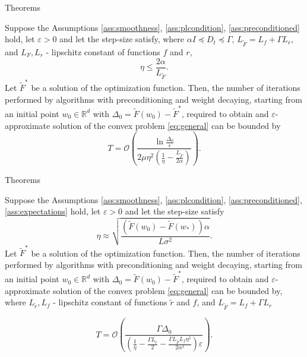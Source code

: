 \documentclass[aspectratio=169, 12pt]{beamer}
\begin{document}
\begin{frame}{Theorems}
    \begin{theorem}
\label{theor:2}
    Suppose the Assumptions \ref{ass:smoothness}, \ref{ass:plcondition}, \ref{ass:preconditioned} hold, let $\varepsilon > 0$ and let the step-size satisfy, where $\alpha I \preccurlyeq D_t \preccurlyeq \Gamma$, $L_{\tilde{F}} = L_{f} + \Gamma L_{r}$, and $L_{F}, L_{r}$ - lipschitz constant of functions $f$ and $r$, 
    \begin{equation*}
        \eta \leq \frac{2 \alpha}{L_{\widetilde{F}}}.
    \end{equation*}
    Let $\tilde{F}^*$ be a solution of the optimization function. Then, the number of iterations performed by algorithms with preconditioning and weight decaying, starting from an initial point $w_0 \in \mathbb{R}^d$ with $\Delta_0 = \tilde{F}(w_0) - \tilde{F}^*$, required to obtain and $\varepsilon$-approximate solution of the convex problem \eqref{eq:general} can be bounded by
    \begin{equation*}
        T =  \mathcal{O}\left( \frac{\ln \frac{\Delta_0}{\epsilon}}{2 \mu \eta^2 \left(\frac{1}{\eta} - \frac{L_{\tilde{F}}}{2 \alpha} \right)} \right).
    \end{equation*}
\end{theorem}
\end{frame}

\begin{frame}[shrink]{Theorems}
    \begin{theorem}[3]
    Suppose the Assumptions \ref{ass:smoothness}, \ref{ass:plcondition}, \ref{ass:preconditioned}, \ref{ass:expectations} hold, let $\varepsilon > 0$ and let the step-size satisfy
    \begin{equation*}
        \eta \approx \sqrt{\frac{\left( \tilde{F}(w_0) - \tilde{F}(w_*) \right)\alpha}{L \sigma^2}}.
    \end{equation*}
    Let $\tilde{F}^*$ be a solution of the optimization function. Then, the number of iterations performed by algorithms with preconditioning and weight decaying, starting from an initial point $w_0 \in \mathbb{R}^d$ with $\Delta_0 = \tilde{F}(w_0) - \tilde{F}^*$, required to obtain and $\varepsilon$-approximate solution of the convex problem \eqref{eq:general} can be bounded by, where $L_{\tilde{r}}, L_{f}$ - lipschitz constant of functions $\tilde{r}$ and $f$, and $L_{\tilde{F}} = L_{f} + \Gamma L_{r}$
    
    \begin{equation*}
        T =  \mathcal{O}\left( \frac{\Gamma \Delta_0}{\left(\frac{1}{\eta} - \frac{ \Gamma L_{\tilde{r}}}{2} - \frac{\Gamma L_{\tilde{F} }L_{f}\eta^2}{2\alpha^2} \right) \varepsilon} \right).
\end{equation*}
    \label{theor:3}
\end{theorem}
\end{frame}
\end{document}
